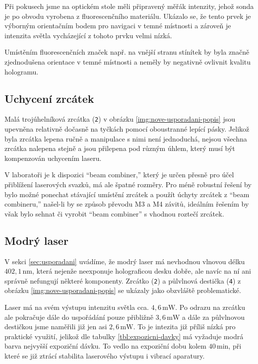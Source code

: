 \documentclass[twoside,project]{../MFFPrace}
\begin{document}
Při pokusech jsme na optickém stole měli připravený měřák intenzity, jehož sonda je po obvodu vyrobena z fluorescenčního materiálu. Ukázalo se, že tento prvek je výborným orientačním bodem pro navigaci v temné místnosti a zároveň je intenzita světla vycházející z tohoto prvku velmi nízká.

Umístěním fluorescenčních značek např. na vnější stranu stínítek by byla značně zjednodušena orientace v temné místnosti a neměly by negativně ovlivnit kvalitu hologramu.

\subsection*{Uchycení zrcátek}
Malá trojúhelníková zrcátka (\texttt{2}) v obrázku \ref{img:nove-usporadani-popis} jsou upevněna relativně dočasně na tyčkách pomocí oboustranné lepící pásky. Jelikož byla zrcátka lepena ručně a manipulace s nimi není jednoduchá, nejsou všechna zrcátka nalepena stejně a jsou přilepena pod různým úhlem, který musí být kompenzován uchycením laseru.

V laboratoři je k dispozici "`beam combiner,"' který je určen přesně pro účel přiblížení laserových svazků, má ale špatné rozměry. Pro méně robustní řešení by bylo možné ponechat stávající umístění zrcátek a použít úchyty zrcátek z "`beam combineru,"' našel-li by se způsob převodu M3 a M4 závitů, ideálním řešením by však bylo sehnat či vyrobit "`beam combiner"' s vhodnou roztečí zrcátek.

\subsection*{Modrý laser}
V sekci \ref{sec:usporadani} uvádíme, že modrý laser má nevhodnou vlnovou délku $402{,}1\,\text{nm}$, která nejenže neexponuje holograficou desku dobře, ale navíc na ní ani správně nefungují některé komponenty. Zrcátko (\texttt{2}) a půlvlnová destička (\texttt{4}) z obrázku \ref{img:nove-usporadani-popis} se ukázaly jako obzvláště problematické.

Laser má na svém výstupu intenzitu světla cca. $4{,}6\,\text{mW}$. Po odrazu na zrcátku ale pokračuje dále do uspořádání pouze přibližně $3{,}6\,\text{mW}$ a dále za půlvlnovou destičkou jsme naměřili již jen asi $2{,}6\,\text{mW}$. To je intezita již příliš nízká pro praktické využití, jelikož dle tabulky \ref{tbl:expozicni-davky} má vyžaduje modrá barva nejvyšší expoziční dávku. To vedlo na expoziční dobu kolem $40\,\text{min}$, při které se již ztrácí stabilita laserového výstupu i vibrací aparatury.
\end{document}
